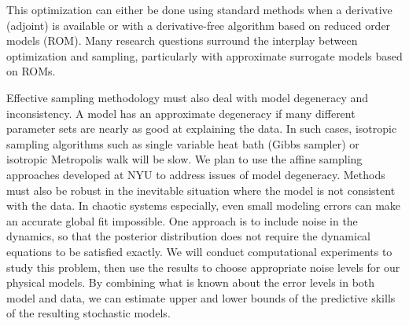 \documentclass[11pt]{article}
\begin{document}
This optimization can either be done using standard methods when a derivative (adjoint) is available
or with a derivative-free algorithm based on reduced order models (ROM).
Many research questions surround the interplay between optimization and
sampling, particularly with approximate surrogate models based on ROMs.

Effective sampling methodology must also deal with model degeneracy and inconsistency.
A model has an approximate degeneracy if many different parameter sets are nearly as good at explaining the data.
In such cases, isotropic sampling algorithms such as single variable heat bath (Gibbs sampler) or isotropic
Metropolis walk will be slow. We plan to use the affine sampling approaches developed at NYU to address issues of model degeneracy.
Methods must also be robust in the inevitable situation where the model is not consistent with the
data.
In chaotic systems especially, even small modeling errors can make an accurate global fit impossible.
One approach is to include noise in the dynamics, so that the posterior distribution does not require the
dynamical equations to be satisfied exactly.
We will conduct computational experiments to study this problem, then use the results to 
choose appropriate noise levels for our physical models.
By combining what is known about the error levels in both model and data, we can estimate upper and lower bounds
of the predictive skills of the resulting stochastic models.
\end{document}
